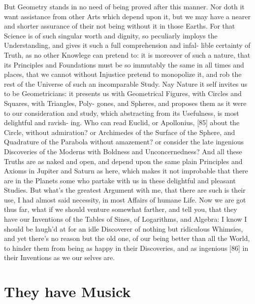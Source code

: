 \documentclass[letterpaper]{book}
\begin{document}
But Geometry stands in no need of being proved after this manner. Nor doth
it want assistance from other Arts which depend upon it, but we may have a
nearer and shorter assurance of their not being without it in those Earths.
For that Science is of such singular worth and dignity, so peculiarly
imploys the Understanding, and gives it such a full comprehension and infal-
lible certainty of Truth, as no other Knowlege can pretend to: it is
moreover of such a nature, that its Principles and Foundations must be so
immutably the same in all times and places, that we cannot without Injustice
pretend to monopolize it, and rob the rest of the Universe of such an
incomparable Study. Nay Nature it self invites us to be Geometricians: it
presents us with Geometrical Figures, with Circles and Squares, with
Triangles, Poly- gones, and Spheres, and proposes them as it were to our
consideration and study, which abstracting from its Usefulness, is most
delightful and ravish- ing. Who can read Euclid, or Apollonius, [85] about
the Circle, without admiration? or Archimedes of the Surface of the Sphere,
and Quadrature of the Parabola without amazement? or consider the late
ingenious Discoveries of the Moderns with Boldness and Unconcernedness? And
all these Truths are as naked and open, and depend upon the same plain
Principles and Axioms in Jupiter and Saturn as here, which makes it not
improbable that there are in the Planets some who partake with us in these
delightful and pleasant Studies. But what's the greatest Argument with me,
that there are such is their use, I had almost said necessity, in most
Affairs of humane Life.  Now we are got thus far, what if we should venture
somewhat farther, and tell you, that they have our Inventions of the Tables
of Sines, of Logarithms, and Algebra: I know I should be laugh'd at for an
idle Discoverer of nothing but ridiculous Whimsies, and yet there's no
reason but the old one, of our being better than all the World, to hinder
them from being as happy in their Discoveries, and as ingenious [86] in
their Inventions as we our selves are.


\section{They have Musick}
\end{document}
